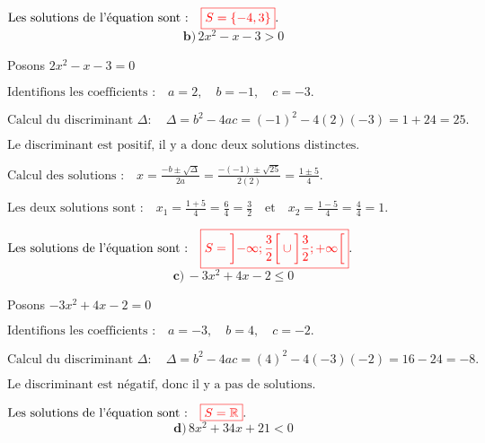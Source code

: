 \documentclass[12pt,a4paper]{article}
\begin{document}
\(
\text{Les solutions de l'équation sont :} \quad
\textcolor{red}{\boxed{S=\left\lbrace  -4 , 3\right\rbrace  }}.
\)
\\
\[
\textbf{b)} \, 2x^2 - x - 3 > 0
\]

Posons \( 2x^2 - x - 3 = 0 \)

\(
\text{Identifions les coefficients :} \quad a = 2, \quad b = -1, \quad c = -3.
\)

\(
\text{Calcul du discriminant } \Delta : \quad
\Delta = b^2 - 4ac = (-1)^2 - 4(2)(-3) = 1 + 24  = 25.
\)

\(
\text{Le discriminant est positif, il y a donc deux solutions distinctes.}
\)

\(
\text{Calcul des solutions :} \quad
x = \frac{-b \pm \sqrt{\Delta}}{2a} = \frac{-(-1) \pm \sqrt{25}}{2(2)} = \frac{1 \pm 5}{4}.
\)

\(
\text{Les deux solutions sont :} \quad
x_1 = \frac{1 + 5}{4} = \frac{6}{4} = \frac{3}{2} \quad \text{et} \quad x_2 = \frac{1 - 5}{4} = \frac{4}{4} = 1.
\)


\(
\text{Les solutions de l'équation sont :} \quad
\textcolor{red}{\boxed{S=\left]-\infty;\frac{3}{2} \right[ \cup\left] \frac{3}{2};+\infty \right[ }}.
\)
\\
\[ \textbf{c)} \, -3x^2 + 4x - 2 \leq 0 \]

Posons \( -3x^2 + 4x - 2 = 0 \)

\(
\text{Identifions les coefficients :} \quad a = -3, \quad b = 4, \quad c = -2.
\)

\(
\text{Calcul du discriminant } \Delta : \quad
\Delta = b^2 - 4ac = (4)^2 - 4(-3)(-2) = 16 - 24  = -8.
\)

\(
\text{Le discriminant est négatif, donc il y a pas de solutions.}
\)


\(
\text{Les solutions de l'équation sont :} \quad
\textcolor{red}{\boxed{S=\mathbb{R} }}.
\)
\\
\[
\textbf{d)} \, 8x^2 + 34x + 21 < 0
\]
\end{document}
